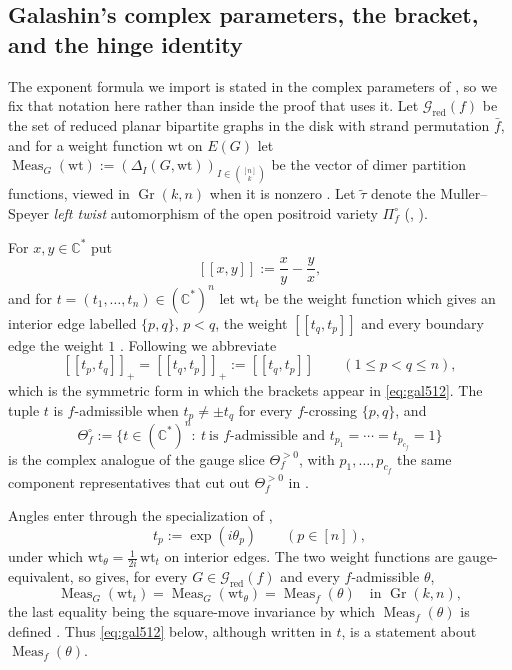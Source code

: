 \documentclass[11pt]{article}
\theoremstyle{definition}
\DeclareMathOperator{\Gr}{Gr}
\DeclareMathOperator{\Meas}{Meas}
\newcommand{\C}{\mathbb{C}}
\newcommand{\Thef}{\Theta_f^{>0}}
\newcommand{\ba}{\bar f}
\begin{document}
\subsection{Galashin's complex parameters, the bracket, and the hinge identity}\label{sec:bracket}

The exponent formula we import is stated in the complex parameters of \cite[\S1.4]{Galashin}, so we fix
that notation here rather than inside the proof that uses it. Let $\mathcal G_{\mathrm{red}}(f)$ be the
set of reduced planar bipartite graphs in the disk with strand permutation $\ba$, and for a weight
function $\mathrm{wt}$ on $E(G)$ let $\Meas_G(\mathrm{wt}):=(\Delta_I(G,\mathrm{wt}))_{I\in\binom{[n]}k}$
be the vector of dimer partition functions, viewed in $\Gr(k,n)$ when it is nonzero
\cite[\S1.1,\S5.1]{Galashin}. Let $\widetilde\tau$ denote the Muller--Speyer \emph{left twist}
automorphism of the open positroid variety $\Pi_f^\circ$ (\cite[\S5.4, eq.~(5.6)]{Galashin},
\cite{MullerSpeyer}).

For $x,y\in\C^*$ put
\begin{equation}\label{eq:bracket}
   [\![x,y]\!]:=\frac xy-\frac yx ,
\end{equation}
and for $t=(t_1,\dots,t_n)\in(\C^*)^n$ let $\mathrm{wt}_t$ be the weight function which gives an interior
edge labelled $\{p,q\}$, $p<q$, the weight $[\![t_q,t_p]\!]$ and every boundary edge the weight $1$
\cite[Def.~1.12, eq.~(1.4)]{Galashin}. Following \cite[\S5.4]{Galashin} we abbreviate
\begin{equation}\label{eq:bracket-plus}
   [\![t_p,t_q]\!]_+=[\![t_q,t_p]\!]_+:=[\![t_q,t_p]\!]\qquad(1\le p<q\le n),
\end{equation}
which is the symmetric form in which the brackets appear in \eqref{eq:gal512}. The tuple $t$ is
$f$-admissible when $t_p\ne\pm t_q$ for every $f$-crossing $\{p,q\}$, and
\begin{equation}\label{eq:theta-circ}
   \Theta_f^{\circ}:=\{t\in(\C^*)^n:\ t\ \text{is }f\text{-admissible and }
   t_{p_1}=\cdots=t_{p_{c_f}}=1\}
\end{equation}
\cite[eq.~(5.2)]{Galashin} is the complex analogue of the gauge slice $\Thef$, with $p_1,\dots,p_{c_f}$
the same component representatives that cut out $\Thef$ in \cite[eq.~(4.3)]{Galashin}.

Angles enter through the specialization of \cite[eq.~(5.1)]{Galashin},
\begin{equation}\label{eq:t-of-theta}
   t_p:=\exp(i\theta_p)\qquad(p\in[n]),
\end{equation}
under which $\mathrm{wt}_\theta=\tfrac1{2i}\,\mathrm{wt}_t$ on interior edges. The two weight functions
are gauge-equivalent, so \cite[Lem.~5.13]{Galashin} gives, for every $G\in\mathcal G_{\mathrm{red}}(f)$
and every $f$-admissible $\theta$,
\begin{equation}\label{eq:meas-identification}
   \Meas_G(\mathrm{wt}_t)=\Meas_G(\mathrm{wt}_\theta)=\Meas_f(\theta)\quad\text{in }\Gr(k,n),
\end{equation}
the last equality being the square-move invariance by which $\Meas_f(\theta)$ is defined
\cite[\S1.2]{Galashin}. Thus \eqref{eq:gal512} below, although written in $t$, is a statement about
$\Meas_f(\theta)$.
\end{document}
